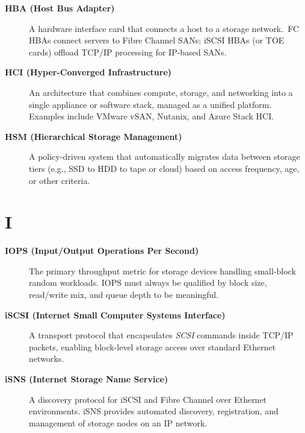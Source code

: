 \begin{description}

\item[\textbf{HBA (Host Bus Adapter)}]
A hardware interface card that connects a host to a storage network.\ FC
HBAs connect servers to Fibre Channel SANs; iSCSI HBAs (or TOE cards)
offload TCP/IP processing for IP-based SANs.

\item[\textbf{HCI (Hyper-Converged Infrastructure)}]
An architecture that combines compute, storage, and networking into a single
appliance or software stack, managed as a unified platform. Examples
include VMware vSAN, Nutanix, and Azure Stack HCI.

\item[\textbf{HSM (Hierarchical Storage Management)}]
A policy-driven system that automatically migrates data between storage
tiers (e.g., SSD to HDD to tape or cloud) based on access frequency,
age, or other criteria.

\end{description}

\section*{I}

\begin{description}

\item[\textbf{IOPS (Input/Output Operations Per Second)}]
The primary throughput metric for storage devices handling small-block
random workloads. IOPS must always be qualified by block size, read/write
mix, and queue depth to be meaningful.

\item[\textbf{iSCSI (Internet Small Computer Systems Interface)}]
A transport protocol that encapsulates \textit{SCSI} commands inside TCP/IP
packets, enabling block-level storage access over standard Ethernet
networks.

\item[\textbf{iSNS (Internet Storage Name Service)}]
A discovery protocol for iSCSI and Fibre Channel over Ethernet environments.
iSNS provides automated discovery, registration, and management of storage
nodes on an IP network.

\end{description}


